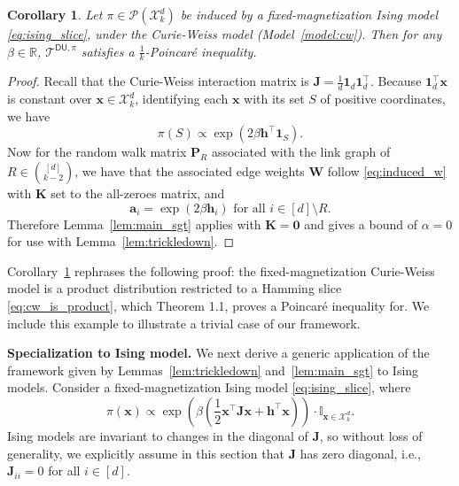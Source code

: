 \documentclass[11pt]{article}
\newtheorem{corollary}{Corollary}
\newcommand{\R}{\mathbb{R}}
\newcommand{\half}{\frac{1}{2}}
\newcommand{\1}{\mathbf{1}}
\newcommand{\0}{\mathbf{0}}
\newcommand{\ind}{\mathbb{I}}
\newcommand{\Par}[1]{\left(#1\right)}
\newcommand{\vzero}{\mathbf{0}}
\newcommand{\mj}{{\mathbf{J}}}
\newcommand{\mk}{{\mathbf{K}}}
\newcommand{\mpp}{{\mathbf{P}}}
\newcommand{\mw}{{\mathbf{W}}}
\newcommand{\va}{{\mathbf{a}}}
\newcommand{\vh}{{\mathbf{h}}}
\newcommand{\vx}{{\mathbf{x}}}
\newcommand{\calP}{{\mathcal{P}}}
\newcommand{\calT}{{\mathcal{T}}}
\newcommand{\calX}{{\mathcal{X}}}
\newcommand{\TDU}[1]{\calT^{\mathsf{DU}, #1}}
\begin{document}

\begin{corollary}\label{cor:cw_trickle}
Let $\pi \in \calP(\calX^d_k)$ be induced by a fixed-magnetization Ising model \eqref{eq:ising_slice}, under the Curie-Weiss model (Model~\ref{model:cw}). Then for any $\beta \in \R$, $\TDU{\pi}$ satisfies a $\frac 1 k$-Poincar\'e inequality.
\end{corollary}
\begin{proof}
Recall that the Curie-Weiss interaction matrix is $\mj = \frac 1 d \1_d\1_d^\top$. Because $\1_d^\top \vx$ is constant over $\vx \in \calX^d_k$, identifying each $\vx$ with its set $S$ of positive coordinates, we have
\begin{equation}\label{eq:cw_is_product}\pi(S) \propto \exp\Par{2\beta \vh^\top \1_S}.\end{equation}
Now for the random walk matrix $\mpp_R$ associated with the link graph of $R \in \binom{[d]}{k - 2}$, we have that the associated edge weights $\mw$ follow \eqref{eq:induced_w} with $\mk$ set to the all-zeroes matrix, and
\[\va_i = \exp\Par{2\beta \vh_i} \text{ for all } i \in [d] \setminus R.\]
Therefore Lemma~\ref{lem:main_sgt} applies with $\mk = \vzero$ and gives a bound of $\alpha = 0$ for use with Lemma~\ref{lem:trickledown}.
\end{proof}

Corollary~\ref{cor:cw_trickle} rephrases the following proof: the fixed-magnetization Curie-Weiss model is a product distribution restricted to a Hamming slice \eqref{eq:cw_is_product}, which Theorem 1.1, \cite{AnariLGV19} proves a Poincar\'e inequality for. We include this example to illustrate a trivial case of our framework.

\textbf{Specialization to Ising model.} We next derive a generic application of the framework given by Lemmas~\ref{lem:trickledown} and~\ref{lem:main_sgt} to Ising models. Consider a fixed-magnetization Ising model \eqref{eq:ising_slice}, where
\[\pi(\vx) \propto \exp\Par{\beta\Par{\half \vx^\top \mj \vx + \vh^\top \vx}} \cdot \ind_{\vx \in \calX^d_k}.\]
Ising models are invariant to changes in the diagonal of $\mj$, so without loss of generality, we explicitly assume in this section that $\mj$ has zero diagonal, i.e., $\mj_{ii} = 0$ for all $i \in [d]$.
\end{document}

